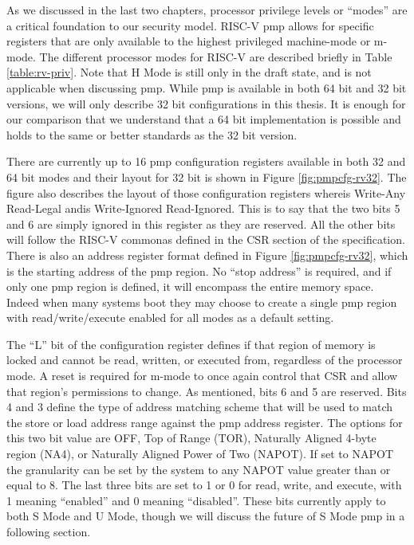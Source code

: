 As we discussed in the last two chapters, processor privilege levels or ``modes'' are a critical foundation to our security model. RISC-V \gls{pmp} allows for specific registers that are only available to the highest privileged machine-mode or m-mode. The different processor modes for RISC-V are described briefly in Table \ref{table:rv-priv}. Note that H Mode is still only in the draft state, and is not applicable when discussing \gls{pmp}. While \gls{pmp} is available in both 64 bit and 32 bit versions, we will only describe 32 bit configurations in this thesis. It is enough for our comparison that we understand that a 64 bit implementation is possible and holds to the same or better standards as the 32 bit version. 

\renewcommand{\arraystretch}{1}


There are currently up to 16 \gls{pmp} configuration registers available in both 32 and 64 bit modes and their layout for 32 bit is shown in Figure \ref{fig:pmpcfg-rv32}. The figure also describes the layout of those configuration registers where\;\warl\;is Write-Any Read-Legal and\;\wiri\;is Write-Ignored Read-Ignored. This is to say that the two bits 5 and 6 are simply ignored in this register as they are reserved. All the other bits will follow the RISC-V common\;\warl\;as defined in the CSR section of the specification. There is also an address register format defined in Figure \ref{fig:pmpcfg-rv32}, which is the starting address of the \gls{pmp} region. No ``stop address'' is required, and if only one \gls{pmp} region is defined, it will encompass the entire memory space. Indeed when many systems boot they may choose to create a single \gls{pmp} region with read/write/execute enabled for all modes as a default setting.

The ``L'' bit of the configuration register defines if that region of memory is locked and cannot be read, written, or executed from, regardless of the processor mode. A reset is required for m-mode to once again control that CSR and allow that region's permissions to change. As mentioned, bits 6 and 5 are reserved. Bits 4 and 3 define the type of address matching scheme that will be used to match the store or load address range against the \gls{pmp} address register. The options for this two bit value are OFF, Top of Range (TOR), Naturally Aligned 4-byte region (NA4), or Naturally Aligned Power of Two (NAPOT). If set to NAPOT the granularity can be set by the system to any NAPOT value greater than or equal to 8. The last three bits are set to 1 or 0 for read, write, and execute, with 1 meaning ``enabled'' and 0 meaning ``disabled''. These bits currently apply to both S Mode and U Mode, though we will discuss the future of S Mode \gls{pmp} in a following section.

